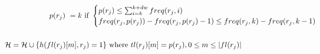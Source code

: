 \documentclass[12pt,a4paper]{report}
\begin{document}
	\begin{eqnarray*}
	&\hspace{-14.4cm}\text{Foreach } r_{j} \in \mathcal{R} \nonumber\\
	&\hspace{-11.9cm}p(r_{j}) = 0, inc(r_{j}) = 0 \\
	&\hspace{-12.1cm}\text{for } k = 1 \text{ to } D-dw \\
           &\hspace{1cm}p(r_{j}) \text{ }  = k \text{ if } 
	\begin{cases}	
p(r_{j}) \le \sum_{i=k}^{k+dw} freq(r_{j}, i) \\ freq(r_{j}, p(r_{j}))-freq(r_{j}, p(r_{j})-1) \le freq(r_{j}, k) - freq(r_{j}, k-1)\\
	\end{cases}\\
	&\hspace{-10.9cm}\text{for } k = p(r_{j}-sw) \text{ to } p(r_{j})\\
	&\hspace{-1.1cm}\mathcal{H} = \mathcal{H} \cup \{h(fl(r_{j})[m], r_{j})= 1 \} \text{ where } tl(r_{j})[m] = p(r_{j}), 0 \le m \le |fl(r_{j})|\\
	&\hspace{-14.6cm}\text{endfor} \\
	&\hspace{-15.2cm}\text{endforeach} \\
	&\hspace{-11.4cm}maxList = \max\{fl(r_{j})| r_{j} \in \mathcal{R}\} \\
	&\hspace{-14.5cm}\text{for } i = 1 \text{ to } U \\
	&\hspace{-13.1cm}\text{for } j = 1 \text{ to } R \\
	&\hspace{-10.1cm}h(u_{i}, r_{j}) = \frac{h(u_{i}, r_{j}) \times fl(r_{j})}{maxList} \\
	&\hspace{-14.6cm}\text{endfor} \\
	&\hspace{-15.9cm}\text{endfor} \\
	&\hspace{-10.2cm}u_{influential} = max\{\frac{hsum(u_{i})}{vsum(u_{i})}| 1 \le i \le U\}
	\end{eqnarray*}
\end{document}
